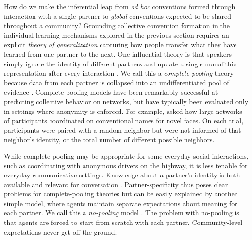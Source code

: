 
How do we make the inferential leap from \emph{ad hoc} conventions formed through interaction with a single partner to \emph{global} conventions expected to be shared throughout a community?
Grounding collective convention formation in the individual learning mechanisms explored in the previous section requires an explicit \emph{theory of generalization} capturing how people transfer what they have learned from one partner to the next.
One influential theory is that speakers simply ignore the identity of different partners and update a single monolithic representation after every interaction \cite{steels_self-organizing_1995,barr_establishing_2004,young_evolution_2015}.
We call this a \emph{complete-pooling} theory because data from each partner is collapsed into an undifferentiated pool of evidence \cite{gelman2006data}. 
Complete-pooling models have been remarkably successful at predicting collective behavior on networks, but have typically been evaluated only in settings where anonymity is enforced. 
For example,  asked how large networks of participants coordinated on conventional names for novel faces.
On each trial, participants were paired with a random neighbor but were not informed of that neighbor's identity, or the total number of different possible neighbors. 

While complete-pooling may be appropriate for some everyday social interactions, such as coordinating with anonymous drivers on the highway, it is less tenable for everyday communicative settings.
Knowledge about a partner's identity is both available and relevant for conversation \cite{eckert_three_2012, davidson_nice_1986}.
Partner-specificity thus poses clear problems for complete-pooling theories but can be easily explained by another simple model, where agents maintain separate expectations about meaning for each partner.
We call this a \emph{no-pooling} model \cite<note that this no-pooling model was compared with a complete-pooling model in>{SmithEtAl17_LanguageLearning}.
The problem with no-pooling is that agents are forced to start from scratch with each partner.
Community-level expectations never get off the ground.

